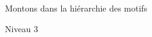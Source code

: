 \documentclass[preview]{standalone}
\begin{document}
\begin{center}
Montons dans la hiérarchie des motifs
    
    Niveau 3
\end{center}
\end{document}
